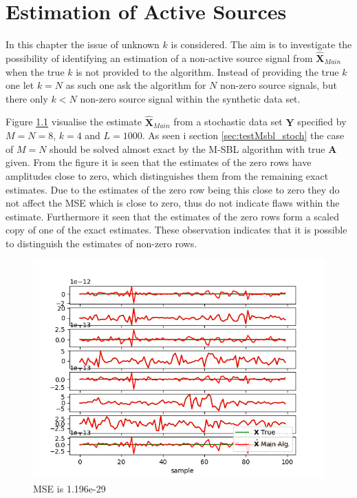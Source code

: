 \chapter{Estimation of Active Sources}
In this chapter the issue of unknown $k$ is considered. The aim is to investigate the possibility of identifying an estimation of a non-active source signal from $\hat{\textbf{X}}_{Main}$ when the true $k$ is not provided to the algorithm. Instead of providing the true $k$ one let $k=N$ as such one ask the algorithm for $N$ non-zero source signals, but there only $k<N$ non-zero source signal within the synthetic data set. 

Figure \ref{fig:ktest1} visualise the estimate $\hat{\textbf{X}}_{Main}$ from a stochastic data set $\textbf{Y}$ specified by $M=N=8$, $k=4$ and $L=1000$. 
As seen i section \ref{sec:testMsbl_stoch} the case of $M=N$ should be solved almost exact by the M-SBL algorithm with true $\textbf{A}$ given. From the figure it is seen that the estimates of the zero rows have amplitudes close to zero, which distinguishes them from the remaining exact estimates. Due to the estimates of the zero row being this close to zero they do not affect the MSE which is close to zero, thus do not indicate flaws within the estimate. 
Furthermore it seen that the estimates of the zero rows form a scaled copy of one of the exact estimates. These observation indicates that it is possible to distinguish the estimates of non-zero rows.     

\begin{figure}[H]
    \centering
	\includegraphics[scale=0.5]{figures/ch_estimate/k_test1.png}
	\caption{MSE is 1.196e-29}
	\label{fig:ktest1}
\end{figure}

